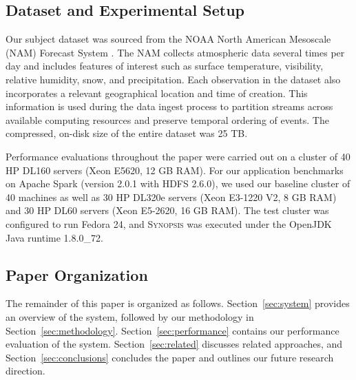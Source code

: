 \subsection{Dataset and Experimental Setup}
Our subject dataset was sourced from the NOAA North American Mesoscale (NAM) Forecast System \cite{noaa_nam}.  The NAM collects atmospheric data several times per day and includes features of interest such as surface temperature, visibility, relative humidity, snow, and precipitation. Each observation in the dataset also incorporates a relevant geographical location and time of creation. This information is used during the data ingest process to partition streams across available computing resources and preserve temporal ordering of events. The compressed, on-disk size of the entire dataset was 25 TB.

Performance evaluations throughout the paper were carried out on a cluster of 40 HP DL160 servers (Xeon E5620, 12 GB RAM). For our application benchmarks on Apache Spark (version 2.0.1 with HDFS 2.6.0), we used our baseline cluster of 40 machines as well as 30 HP DL320e servers (Xeon E3-1220 V2, 8 GB RAM) and 30 HP DL60 servers (Xeon E5-2620, 16 GB RAM). The test cluster was configured to run Fedora 24, and \textsc{Synopsis} was executed under the OpenJDK Java runtime 1.8.0\_72.

\subsection{Paper Organization}
The remainder of this paper is organized as follows. Section~\ref{sec:system} provides an overview of the system, followed by our methodology in Section~\ref{sec:methodology}. Section~\ref{sec:performance} contains our performance evaluation of the system. Section~\ref{sec:related} discusses related approaches, and Section~\ref{sec:conclusions} concludes the paper and outlines our future research direction.
